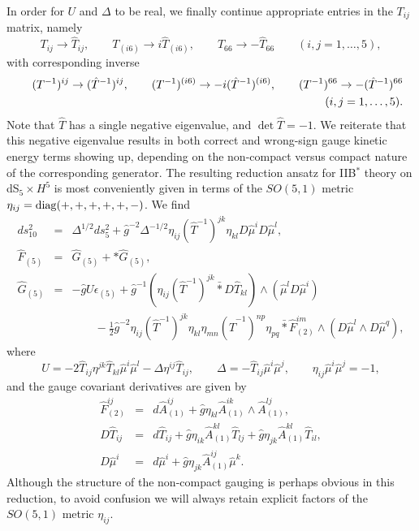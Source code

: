 \documentclass[a4paper,12pt]{article}
\begin{document}
In order for $U$ and $\Delta$ to be real, we finally continue
appropriate entries in the $T_{ij}$ matrix, namely
%
\begin{equation}
T_{ij}\to \hat T_{ij},\qquad
T_{(i6)}\to i\hat T_{(i6)},\qquad
T_{66}\to-\hat T_{66} \qquad (i,j=1, \ldots,5),
\end{equation}
%
with corresponding inverse
%
\begin{eqnarray}
&&(T^{-1})^{ij}\to (\hat T^{-1})^{ij},\qquad
(T^{-1})^{(i6)}\to -i(\hat T^{-1})^{(i6)},\qquad
(T^{-1})^{66}\to-(\hat T^{-1})^{66}\nonumber\\
&&\kern26em (i,j=1, \ldots,5).
\end{eqnarray}
%
Note that $\hat T$ has a single negative eigenvalue, and $\det\hat T=-1$.
We reiterate that this negative eigenvalue results in both correct and
wrong-sign gauge kinetic energy terms showing up, depending on the
non-compact versus compact nature of the corresponding generator.
The resulting reduction ansatz for IIB$^*$ theory on dS$_5\times H^5$ is
most conveniently given in terms of the $SO(5,1)$ metric
$\eta_{ij}={\rm diag}(+,+,+,+,+,-)$.  We find
%
\begin{eqnarray}
ds^2_{10}&=&\Delta^{1/2}ds_5^2+\hat{g}^{-2}\Delta^{-1/2}
\eta_{ij}(\hat T^{-1})^{jk}\eta_{kl}D\hat\mu^{i}D\hat\mu^{l},\nonumber\\
\hat{F}_{(5)}&=&\hat{G}_{(5)}+\ast \hat{G}_{(5)},\nonumber\\
\hat{G}_{(5)}&=&-\hat{g}U\epsilon_{(5)}
+\hat{g}^{-1}(\eta_{ij}(\hat T^{-1})^{jk}\bar{\ast}D\hat T_{kl})\wedge
(\hat{\mu}^{l}D\hat\mu^{i})\nonumber\\
&&\qquad-\frac{1}{2}\hat{g}^{-2}\eta_{ij}(\hat T^{-1})^{jk}\eta_{kl}
\eta_{mn}(\hat T^{-1})^{np}\eta_{pq}\bar{\ast}
\hat{F}^{im}_{(2)} \wedge (D\hat\mu^{l} \wedge D\hat\mu^{q}),
\label{eq:b5redans}
\end{eqnarray}
%
where
%
\begin{equation}
U=-2\hat T_{ij}\eta^{jk}\hat T_{kl} \hat{\mu}^i \hat{\mu}^l
-\Delta \eta^{ij}\hat T_{ij},\qquad
\Delta=-\hat T_{ij} \hat{\mu}^i \hat{\mu}^j,\qquad
\eta_{ij}\hat{\mu}^i \hat{\mu}^j = -1,
\end{equation}
%
and the gauge covariant derivatives are given by
%
\begin{eqnarray}
\hat{F}^{ij}_{(2)}&=&d\hat{A}^{ij}_{(1)}
+\hat{g}\eta_{kl}\hat{A}^{ik}_{(1)}\wedge\hat{A}^{lj}_{(1)},\nonumber\\
D\hat T_{ij}&=&d\hat T_{ij}+\hat{g}\eta_{ik}\hat{A}^{kl}_{(1)}\hat T_{lj}
+\hat{g}\eta_{jk}\hat{A}^{kl}_{(1)}\hat T_{il},\nonumber\\
D\hat\mu^i&=&d\hat{\mu}^i + \hat{g}\eta_{jk}\hat{A}^{ij}_{(1)}\hat{\mu}^k.
\label{eq:nccovar}
\end{eqnarray}
%
Although the structure of the non-compact gauging is perhaps obvious in
this reduction, to avoid confusion we will always retain explicit
factors of the $SO(5,1)$ metric $\eta_{ij}$.
\end{document}

